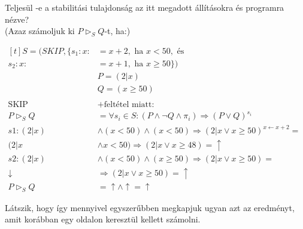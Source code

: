 \documentclass[12pt]{article}
\newcommand{\haromszog}[2]{$#1 \vartriangleright_S #2$}
\begin{document}
Teljesül -e a stabilitási tulajdonság az itt megadott állításokra és programra nézve?\\
(Azaz számoljuk ki \haromszog{P}{Q}-t, ha:)\\
\par
$
\begin{aligned}[t]
S = (SKIP, \{s_1: x :&= x+2, \text{ ha } x<50, \text{ és}\\
	s_2: x :&= x+1, \text{ ha } x\ge 50 \})\\
&P = (2|x)\\
&Q = (x\ge50)\\
 \\
\text{SKIP} &+ \text{feltétel miatt: }\\
P \vartriangleright_S Q &=\forall s_i \in S: (P \land \neg Q \land \pi_i) \Rightarrow (P \lor Q)^{s_i}\\
s1: (2|x) &\land (x<50) \land (x<50) \Rightarrow (2|x \lor x\ge50)^{x \leftarrow x+2} = \\
(2|x &\land x<50) \Rightarrow (2|x \lor x\ge 48) = \uparrow \\
s2: (2|x) &\land (x<50) \land (x\ge50) \Rightarrow (2|x \lor x\ge50) = \\
\downarrow &\Rightarrow (2|x \lor x\ge50) = \uparrow\\
P \vartriangleright_S Q &= \uparrow \land \uparrow = \uparrow
\end{aligned}
$

Látszik, hogy így mennyivel egyszerűbben megkapjuk ugyan azt az eredményt, amit korábban egy oldalon keresztül kellett számolni.
\end{document}
